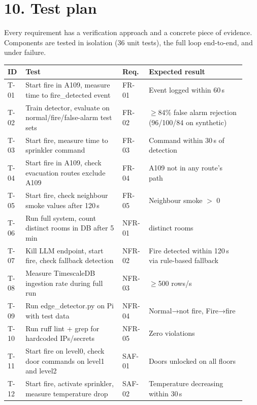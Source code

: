 \documentclass[11pt]{article}
\begin{document}
\section{10. Test plan}

Every requirement has a verification approach and a concrete piece of evidence. Components are tested in isolation (36 unit tests), the full loop end-to-end, and under failure.

\begin{longtable}[]{@{}
  >{\raggedright\arraybackslash}p{0.07\linewidth}
  >{\raggedright\arraybackslash}p{0.38\linewidth}
  >{\raggedright\arraybackslash}p{0.10\linewidth}
  >{\raggedright\arraybackslash}p{0.38\linewidth}@{}}
\toprule
\textbf{ID} & \textbf{Test} & \textbf{Req.} & \textbf{Expected result} \\
\midrule
\endhead
T-01 & Start fire in A109, measure time to fire\_detected event & FR-01 & Event logged within 60\,s \\
T-02 & Train detector, evaluate on normal/fire/false-alarm test sets & FR-02 & $\geq$84\% false alarm rejection (96/100/84 on synthetic) \\
T-03 & Start fire, measure time to sprinkler command & FR-03 & Command within 30\,s of detection \\
T-04 & Start fire in A109, check evacuation routes exclude A109 & FR-04 & A109 not in any route's path \\
T-05 & Start fire, check neighbour smoke values after 120\,s & FR-05 & Neighbour smoke $>$ 0 \\
T-06 & Run full system, count distinct rooms in DB after 5\,min & NFR-01 & 950 distinct rooms \\
T-07 & Kill LLM endpoint, start fire, check fallback detection & NFR-02 & Fire detected within 120\,s via rule-based fallback \\
T-08 & Measure TimescaleDB ingestion rate during full run & NFR-03 & $\geq$500 rows/s \\
T-09 & Run edge\_detector.py on Pi with test data & NFR-04 & Normal→not fire, Fire→fire \\
T-10 & Run ruff lint + grep for hardcoded IPs/secrets & NFR-05 & Zero violations \\
T-11 & Start fire on level0, check door commands on level1 and level2 & SAF-01 & Doors unlocked on all floors \\
T-12 & Start fire, activate sprinkler, measure temperature drop & SAF-02 & Temperature decreasing within 30\,s \\
\bottomrule
\end{longtable}
\end{document}
